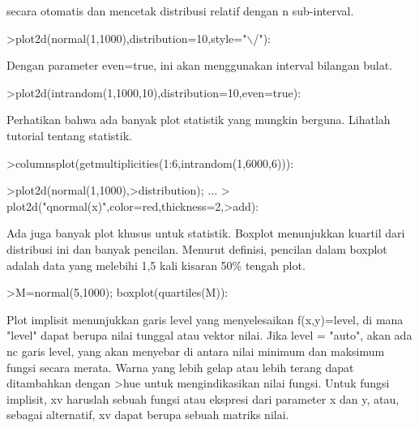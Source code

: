 \documentclass{article}
\begin{document}
\begin{eulernotebook}
\begin{eulercomment}
\begin{eulercomment}
\begin{eulercomment}
\begin{eulercomment}
\begin{eulercomment}
\begin{eulercomment}
\begin{eulercomment}
\begin{eulercomment}
\begin{eulercomment}
secara otomatis dan mencetak distribusi relatif dengan n sub-interval.
\end{eulercomment}
\begin{eulerprompt}
>plot2d(normal(1,1000),distribution=10,style="\(\backslash\)/"):
\end{eulerprompt}
\begin{eulercomment}
Dengan parameter even=true, ini akan menggunakan interval bilangan
bulat.
\end{eulercomment}
\begin{eulerprompt}
>plot2d(intrandom(1,1000,10),distribution=10,even=true):
\end{eulerprompt}
\begin{eulercomment}
Perhatikan bahwa ada banyak plot statistik yang mungkin berguna.
Lihatlah tutorial tentang statistik.
\end{eulercomment}
\begin{eulerprompt}
>columnsplot(getmultiplicities(1:6,intrandom(1,6000,6))):
\end{eulerprompt}
\begin{eulerprompt}
>plot2d(normal(1,1000),>distribution); ...
>  plot2d("qnormal(x)",color=red,thickness=2,>add):
\end{eulerprompt}
\begin{eulercomment}
Ada juga banyak plot khusus untuk statistik. Boxplot menunjukkan
kuartil dari distribusi ini dan banyak pencilan. Menurut definisi,
pencilan dalam boxplot adalah data yang melebihi 1,5 kali kisaran 50\%
tengah plot.
\end{eulercomment}
\begin{eulerprompt}
>M=normal(5,1000); boxplot(quartiles(M)):
\end{eulerprompt}
\begin{eulercomment}
Plot implisit menunjukkan garis level yang menyelesaikan f(x,y)=level,
di mana "level" dapat berupa nilai tunggal atau vektor nilai. Jika
level = "auto", akan ada nc garis level, yang akan menyebar di antara
nilai minimum dan maksimum fungsi secara merata. Warna yang lebih
gelap atau lebih terang dapat ditambahkan dengan \textgreater{}hue untuk
mengindikasikan nilai fungsi. Untuk fungsi implisit, xv haruslah
sebuah fungsi atau ekspresi dari parameter x dan y, atau, sebagai
alternatif, xv dapat berupa sebuah matriks nilai.


\end{eulercomment}
\end{eulercomment}
\end{eulercomment}
\end{eulercomment}
\end{eulercomment}
\end{eulercomment}
\end{eulercomment}
\end{eulercomment}
\end{eulercomment}
\end{eulernotebook}
\end{document}
